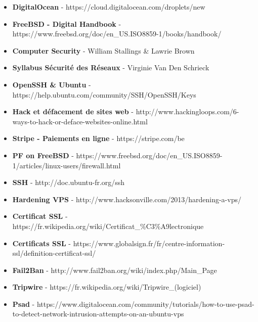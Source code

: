 \documentclass[a4paper,10pt,final,fleqn]{article}
\begin{document}
		\begin{itemize}
			\item \textbf{DigitalOcean} - https://cloud.digitalocean.com/droplets/new
			\item \textbf{FreeBSD - Digital Handbook} - https://www.freebsd.org/doc/en\_US.ISO8859-1/books/handbook/
			\item \textbf{Computer Security} - William Stallings \& Lawrie Brown
			\item \textbf{Syllabus Sécurité des Réseaux} - Virginie Van Den Schrieck
			\item \textbf{OpenSSH \& Ubuntu} - https://help.ubuntu.com/community/SSH/OpenSSH/Keys
			\item \textbf{Hack et défacement de sites web} - http://www.hackingloops.com/6-ways-to-hack-or-deface-websites-online.html
			\item \textbf{Stripe - Paiements en ligne} - https://stripe.com/be
			\item \textbf{PF on FreeBSD} - https://www.freebsd.org/doc/en\_US.ISO8859-1/articles/linux-users/firewall.html
			\item \textbf{SSH} - http://doc.ubuntu-fr.org/ssh
			\item \textbf{Hardening VPS} - http://www.hacksonville.com/2013/hardening-a-vps/
			\item \textbf{Certificat SSL} - https://fr.wikipedia.org/wiki/Certificat\_\%C3\%A9lectronique
			\item \textbf{Certificats SSL} - https://www.globalsign.fr/fr/centre-information-ssl/definition-certificat-ssl/
			\item \textbf{Fail2Ban} - http://www.fail2ban.org/wiki/index.php/Main\_Page
			\item \textbf{Tripwire} - https://fr.wikipedia.org/wiki/Tripwire\_(logiciel)
			\item \textbf{Psad} - https://www.digitalocean.com/community/tutorials/how-to-use-psad-to-detect-network-intrusion-attempts-on-an-ubuntu-vps
		\end{itemize}
\end{document}
